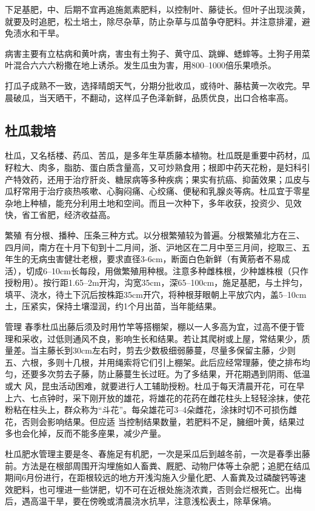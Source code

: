 \documentclass{ctexbook}
\begin{document}
下足基肥，中、后期不宜再追施氮素肥料，以控制叶、藤徒长。但叶子出现淡黄，就要及时追肥，松土培土，除尽杂草，防止杂草与瓜苗争夺肥料。并注意排灌，避免渍水和干旱。

病害主要有立枯病和黄叶病，害虫有土狗子、黄守瓜、跳蝉、蟋蟀等。土狗子用菜叶混合六六六粉撒在地上诱杀。发生瓜虫为害，用800--1000倍乐果喷杀。

打瓜子成熟不一致，选择晴朗天气，分期分批收瓜，或待叶、藤枯黄一次收完。早晨破瓜，当天晒干，不翻动，这样瓜子色泽新鲜，品质优良，出口合格率高。
\subsection{杜瓜栽培}
杜瓜，又名栝楼、药瓜、苦瓜，是多年生草质藤本植物。杜瓜既是重要中药材，瓜籽粒大、肉多，脂肪、蛋白质含量高，又可炒熟食用；根即中药天花粉，是妇科引产特效药，还用于治疗肝炎、糖尿病等多种疾病；果实有抗癌、抑菌效果；瓜皮与瓜籽常用于治疗痰热咳嗽、心胸闷痛、心绞痛、便秘和乳腺炎等病。杜瓜宜于零星杂地上种植，能充分利用土地和空间。而且一次种下，多年收获，投资少、见效快，省工省肥，经济收益高。

繁殖 
有分根、播种、压条三种方式。以分根繁殖较为普遍。分根繁殖北方在三、四月间，南方在十月下旬到十二月间，浙、沪地区在二月中至三月间，挖取三、五年生的无病虫害健壮老根，要求直径3-6cm，断面白色新鲜（有黄筋者不易成活），切成6--10cm长每段，用做繁殖用种根。注意多种雌株根，少种雄株根（只作授粉用）。按行距1.65--2m开沟，沟宽35cm，深65--100cm，施足基肥，与土拌匀，填平、浇水，待土下沉后按株距35cm开穴，将种根芽眼朝上平放穴内，盖5--10cm土，压紧实，保持土壤湿润，约1个月出苗，当年能结果。

管理 春季杜瓜出藤后须及时用竹竿等搭棚架，棚以一人多高为宜，过高不便于管理和采收，过低则通风不良，影响生长和结果。若让其爬树或上屋，常结果少，质量差。当主藤长到30cm左右时，剪去少数极细弱藤蔓，尽量多保留主藤，少则五、六根，多则十几根，并用绳索将它们引上棚架。此后应经常理藤，使之排布均匀，还要多次剪去子藤，防止藤蔓生长过旺。为了多结果，开花期遇到阴雨、低温或大
风，昆虫活动困难，就要进行人工辅助授粉。杜瓜于每天清晨开花，可在早上六、七点钟时，采下刚开放的雄花，将雄花的花药在雌花柱头上轻轻涂抹，使花粉粘在柱头上，群众称为“斗花”。每朵雄花可3--4朵雌花，涂抹时切不可损伤雌花，否则会影响结果。但应适
当控制结果数量，若肥料不足，臃细叶黄，结果过多也会化掉，反而不能多座果，减少产量。

杜瓜肥水管理主要是冬、春施足有机肥，一次是采瓜后到越冬前，一次是春季出藤前。方法是在根部周围开沟埋施如人畜粪、厩肥、动物尸体等土杂肥；追肥在结瓜期间6月份进行，在距根较远的地方开浅沟施入少量化肥、人畜粪及过磷酸钙等速效肥料，也可埋进一些饼肥，切不可在近根处施浇浓粪，否则会烂根死亡。出梅后，遇高温干旱，要在傍晚或清晨浇水抗旱，注意浅松表土，除草保墒。
\end{document}
